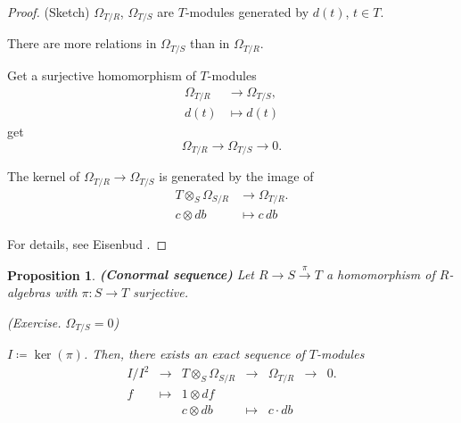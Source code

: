 \documentclass[12pt]{article}
\newtheorem*{proposition}{Proposition}
\theoremstyle{definition}
\begin{document}
\begin{proof}
(Sketch) $\Omega_{T/R}$, $\Omega_{T/S}$ are $T$-modules generated by $d(t)$, $t\in T$.

There are more relations in $\Omega_{T/S}$ than in $\Omega_{T/R}$.

Get a surjective homomorphism of $T$-modules
\begin{align*}
\Omega_{T/R}&\longrightarrow\Omega_{T/S},\\d(t)&\longmapsto d(t)
\end{align*}
get
\[\Omega_{T/R}\longrightarrow\Omega_{T/S}\longrightarrow0.\]

The kernel of $\Omega_{T/R}\rightarrow\Omega_{T/S}$ is generated by the image of
\begin{align*}
T\otimes_S\Omega_{S/R}&\longrightarrow\Omega_{T/R}.\\c\otimes db&\longmapsto c\,db
\end{align*}

For details, see Eisenbud \cite{eisenbud2013commutative}.
\end{proof}

\begin{proposition}
\emph{\textbf{(Conormal sequence)}} Let $R\rightarrow S\xrightarrow\pi T$ a homomorphism of $R$-algebras with $\pi:S\rightarrow T$ surjective.

(Exercise. $\Omega_{T/S}=0$)

$I\coloneqq\ker(\pi)$. Then, there exists an exact sequence of $T$-modules
\[\begin{array}{rcccrcc}I/I^2&\longrightarrow&T\otimes_S\Omega_{S/R}&\longrightarrow&\Omega_{T/R}&\longrightarrow&0.\\f&\longmapsto&1\otimes df\\&&c\otimes db&\longmapsto&c\cdot db\end{array}\]
\end{proposition}
\end{document}
